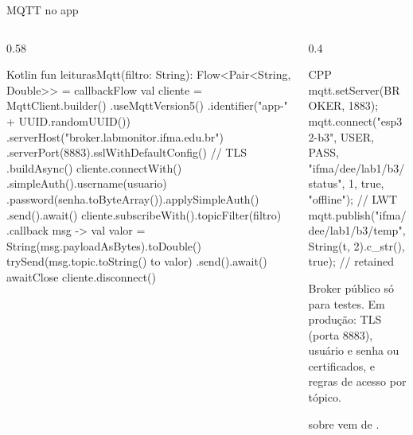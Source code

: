 \documentclass[aspectratio=169,10pt]{beamer}
\begin{document}
\begin{frame}[fragile]{MQTT no app}
  \begin{columns}[T]
    \begin{column}{0.58\textwidth}
\begin{codigo}[title=MqttRepository.kt (HiveMQ MQTT Client)]{Kotlin}
fun leiturasMqtt(filtro: String): Flow<Pair<String, Double>> =
  callbackFlow {
    val cliente = MqttClient.builder()
      .useMqttVersion5()
      .identifier("app-" + UUID.randomUUID())
      .serverHost("broker.labmonitor.ifma.edu.br")
      .serverPort(8883).sslWithDefaultConfig()   // TLS
      .buildAsync()
    cliente.connectWith()
      .simpleAuth().username(usuario)
        .password(senha.toByteArray()).applySimpleAuth()
      .send().await()
    cliente.subscribeWith().topicFilter(filtro)
      .callback { msg ->
        val valor = String(msg.payloadAsBytes).toDouble()
        trySend(msg.topic.toString() to valor)
      }.send().await()
    awaitClose { cliente.disconnect() }
  }
\end{codigo}
    \end{column}
    \begin{column}{0.4\textwidth}
\begin{codigo}[title=ESP32 (PubSubClient)]{CPP}
mqtt.setServer(BROKER, 1883);
mqtt.connect("esp32-b3", USER, PASS,
  "ifma/dee/lab1/b3/status", 1, true,
  "offline");                 // LWT
mqtt.publish("ifma/dee/lab1/b3/temp",
  String(t, 2).c_str(), true); // retained
\end{codigo}
      \begin{atencao}[Segurança]
        Broker público só para testes. Em produção: TLS (porta 8883), usuário e senha ou certificados, e regras de acesso por tópico.
      \end{atencao}
      \begin{dica}
         sobre  vem de .
      \end{dica}
    \end{column}
  \end{columns}
\end{frame}
\end{document}
